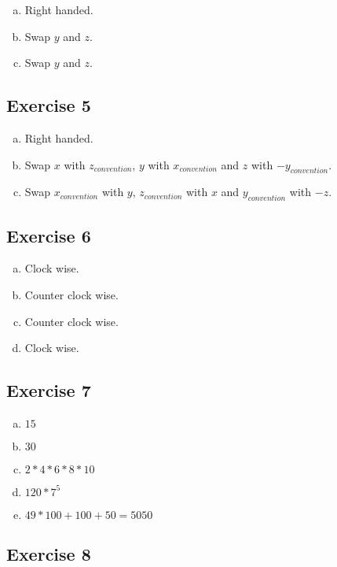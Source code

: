 \documentclass[11pt]{article}
\begin{document}
\begin{enumerate}[a.]
\item Right handed.
\item Swap $y$ and $z$.
\item Swap $y$ and $z$.
\end{enumerate}

\subsection{Exercise 5}

\begin{enumerate}[a.]
\item Right handed.
\item Swap $x$ with $z_{convention}$, $y$ with $x_{convention}$ and $z$ with $-y_{convention}$.
\item Swap $x_{convention}$ with $y$, $z_{convention}$ with $x$ and $y_{convention}$ with $-z$.
\end{enumerate}

\subsection{Exercise 6}

\begin{enumerate}[a.]
\item Clock wise.
\item Counter clock wise.
\item Counter clock wise.
\item Clock wise.
\end{enumerate}

\subsection{Exercise 7}

\begin{enumerate}[a.]
\item $15$
\item $30$
\item $2*4*6*8*10$
\item $120 * 7^5$
\item $49 * 100 + 100 + 50 = 5050$
\end{enumerate}

\subsection{Exercise 8}
\end{document}
